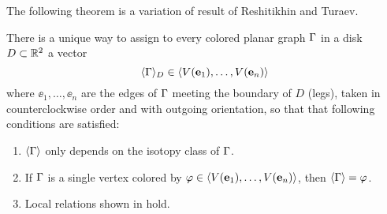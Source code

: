 The following theorem is a variation of result of Reshitikhin and Turaev. 
\begin{thrm}\label{t:RT}
  There is a unique  way to assign to every colored
  planar graph $\Gamma$ in a disk $D\subset \mathbb{R}^2$ a vector
  \begin{equation*}
    \langle\Gamma\rangle_D\in \langle V(\mathbf{e}_1), \dots, V(\mathbf{e}_n) \rangle
  \end{equation*}
  where $\ee_1,\dots, \ee_n$ are the edges of $\Gamma$ meeting the boundary
  of $D$ (legs), taken in counterclockwise order and with outgoing orientation,
  so that that following conditions are satisfied:
  \begin{enumerate}
     \item $\langle\Gamma\rangle$ only depends on the isotopy  class of $\Gamma$.

    \item If $\Gamma$ is a single vertex colored by
          $\varphi\in \langle V(\mathbf{e}_1), \dots,  V(\mathbf{e}_n)\rangle$, then $\langle\Gamma\rangle=\varphi$.
     
    \item Local relations shown in  hold. 



\end{enumerate}
\end{thrm}
